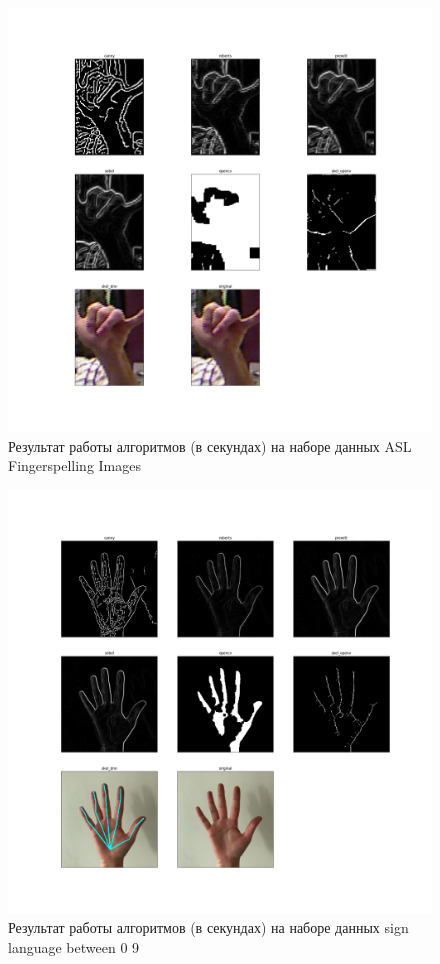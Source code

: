\begin{figure}[!h]
	\centering
	\includegraphics[width=\textwidth,keepaspectratio]{figures/ru/asl2}
	\caption{Результат работы алгоритмов (в секундах) на наборе данных ASL Fingerspelling Images}
	\label{fig:asl2}
\end{figure}

\begin{figure}[!h]
	\centering
	\includegraphics[width=\textwidth,keepaspectratio]{figures/ru/datamix}
	\caption{Результат работы алгоритмов (в секундах) на наборе данных sign language between 0 9}
	\label{fig:datamix}
\end{figure}


